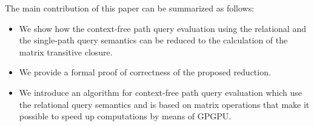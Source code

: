 The main contribution of this paper can be summarized as follows:
\begin{itemize}
	\item We show how the context-free path query evaluation using the relational and the single-path query semantics can be reduced to the calculation of the matrix transitive closure.
	\item We provide a formal proof of correctness of the proposed reduction.
	\item We introduce an algorithm for context-free path query evaluation which use the relational query semantics and is based on matrix operations that make it possible to speed up computations by means of GPGPU.
\end{itemize}
